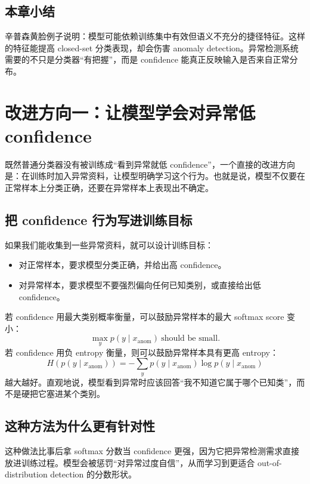 \documentclass[a4paper]{article}
\begin{document}
\subsection{本章小结}

辛普森黄脸例子说明：模型可能依赖训练集中有效但语义不充分的捷径特征。这样的特征能提高 closed-set 分类表现，却会伤害 anomaly detection。异常检测系统需要的不只是分类器“有把握”，而是 confidence 能真正反映输入是否来自正常分布。

\section{改进方向一：让模型学会对异常低 confidence}

既然普通分类器没有被训练成“看到异常就低 confidence”，一个直接的改进方向是：在训练时加入异常资料，让模型明确学习这个行为。也就是说，模型不仅要在正常样本上分类正确，还要在异常样本上表现出不确定。

\subsection{把 confidence 行为写进训练目标}

如果我们能收集到一些异常资料，就可以设计训练目标：
\begin{itemize}
    \item 对正常样本，要求模型分类正确，并给出高 confidence。
    \item 对异常样本，要求模型不要强烈偏向任何已知类别，或直接给出低 confidence。
\end{itemize}

若 confidence 用最大类别概率衡量，可以鼓励异常样本的最大 softmax score 变小：
\[
\max_y p(y\mid x_{\mathrm{anom}})\ \text{should be small}.
\]
若 confidence 用负 entropy 衡量，则可以鼓励异常样本具有更高 entropy：
\[
H(p(y\mid x_{\mathrm{anom}}))=-\sum_y p(y\mid x_{\mathrm{anom}})\log p(y\mid x_{\mathrm{anom}})
\]
越大越好。直观地说，模型看到异常时应该回答“我不知道它属于哪个已知类”，而不是硬把它塞进某个类别。

\subsection{这种方法为什么更有针对性}

这种做法比事后拿 softmax 分数当 confidence 更强，因为它把异常检测需求直接放进训练过程。模型会被惩罚“对异常过度自信”，从而学习到更适合 out-of-distribution detection 的分数形状。
\end{document}

